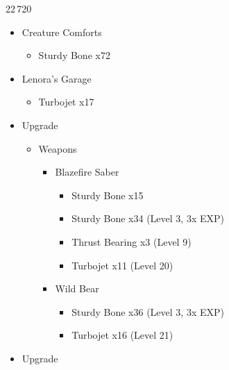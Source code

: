 \begin{paracol}{2}
\begin{shop}{22\,720}
\begin{itemize}
\begin{itemize}
			      \end{itemize}
			\item Creature Comforts
			      \begin{itemize}
				      \item Sturdy Bone x72
			      \end{itemize}
			\item Lenora's Garage
			      \begin{itemize}
				      \item Turbojet x17
			      \end{itemize}
		\end{itemize}
	\end{shop}
	\switchcolumn*

	\begin{upgrade}
		\begin{itemize}
			\item Upgrade
			      \begin{itemize}
				      \item Weapons
				            \begin{itemize}
					            \item Blazefire Saber
					                  \begin{itemize}
						                  \item Sturdy Bone x15
						                  \item Sturdy Bone x34 (Level 3, 3x EXP)
						                  \item Thrust Bearing x3 (Level 9)
						                  \item Turbojet x11 (Level 20)
					                  \end{itemize}
					            \item Wild Bear
					                  \begin{itemize}
						                  \item Sturdy Bone x36 (Level 3, 3x EXP)
						                  \item Turbojet x16 (Level 21)
					                  \end{itemize}
				            \end{itemize}
			      \end{itemize}
		\end{itemize}
	\end{upgrade}
	\switchcolumn
	\begin{upgrade}
		\begin{itemize}
			\item Upgrade

\end{itemize}
\end{upgrade}
\end{paracol}
